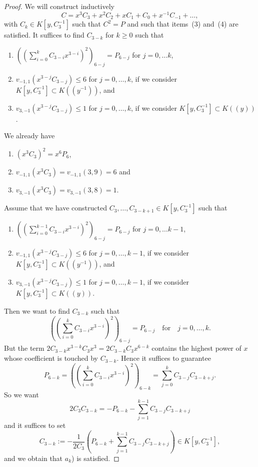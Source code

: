 \documentclass[reqno,a4paper,twoside]{amsart}
\theoremstyle{definition}
\theoremstyle{remark}
\begin{document}
\begin{proof}
We will construct inductively
$$
C=x^3 C_3+x^2 C_2+x C_1 +C_0+ x^{-1}C_{-1}+\dots,
$$
with $C_k\in K[y,C_3^{-1}]$ such that $C^2=P$ and such that items~(3) and~(4) are satisfied. It suffices to find $C_{3-k}$ for $k\ge 0$ such that
\begin{enumerate}
  \item[$a_k$)] $\left(\left(\sum_{i=0}^{k} C_{3-i}x^{3-i}\right)^2\right)_{6-j}=P_{6-j}$ for $j=0,\dots k$,
  \item[$b_k$)] $v_{-1,1}(x^{3-j} C_{3-j})\le 6$ for $j=0,\dots, k$, if we consider $K[y,C_3^{-1}]\subset K((y^{-1}))$, and
  \item[$c_k$)] $v_{3,-1}(x^{3-j} C_{3-j})\le 1$ for $j=0,\dots, k$, if we consider $K[y,C_3^{-1}]\subset K((y))$.
\end{enumerate}

We already have
\begin{enumerate}
  \item[$a_0$)] $(x^3 C_3)^2=x^6 P_6$,
  \item[$b_0$)] $v_{-1,1}(x^3 C_3)=v_{-1,1}(3,9)=6$ and
  \item[$c_0$)] $v_{3,-1}(x^3 C_3)=v_{3,-1}(3,8)=1$.
\end{enumerate}
 Assume that we have constructed $C_3,\dots,C_{3-k+1}\in K[y,C_3^{-1}]$ such that
\begin{enumerate}
  \item[$a_{k-1}$)] $\left(\left(\sum_{i=0}^{k-1} C_{3-i}x^{3-i}\right)^2\right)_{6-j}=P_{6-j}$ for $j=0,\dots k-1$,
  \item[$b_{k-1}$)] $v_{-1,1}(x^{3-j} C_{3-j})\le 6$  for $j=0,\dots, k-1$, if we consider $K[y,C_3^{-1}]\subset K((y^{-1}))$, and
  \item[$c_{k-1}$)] $v_{3,-1}(x^{3-j} C_{3-j})\le 1$  for $j=0,\dots, k-1$, if we consider $K[y,C_3^{-1}]\subset K((y))$.
\end{enumerate}
Then we want to find $C_{3-k}$ such that
$$
\left(\left(\sum_{i=0}^{k} C_{3-i}x^{3-i}\right)^2\right)_{6-j}=P_{6-j}\quad\text{for}\quad j=0,\dots, k.
$$
But the term $2C_{3-k}x^{3-k} C_3x^3=2C_{3-k}C_3x^{6-k}$ contains the highest power of $x$ whose coefficient
is touched by $C_{3-k}$. Hence it suffices to guarantee
$$
P_{6-k}=\left(\left(\sum_{i=0}^{k} C_{3-i}x^{3-i}\right)^2\right)_{6-k}=\sum_{j=0}^{k}C_{3-j}C_{3-k+j}.
$$
So we want
$$
2C_3 C_{3-k}=-P_{6-k}-\sum_{j=1}^{k-1}C_{3-j}C_{3-k+j}
$$
and it suffices to set
\begin{equation}\label{ecuacion de C 3-k}
C_{3-k}:=-\frac{1}{2C_3}\left( P_{6-k}+\sum_{j=1}^{k-1}C_{3-j}C_{3-k+j}\right)\in K[y,C_3^{-1}],
\end{equation}
and we obtain that $a_k$) is satisfied.


\end{proof}
\end{document}

